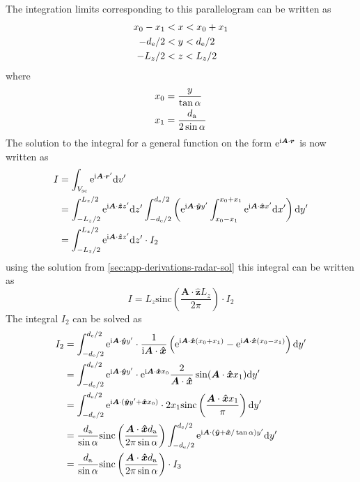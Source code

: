 \documentclass[11pt,twoside]{eitExjobb}
\begin{document}
	The integration limits corresponding to this parallelogram can be written as
	\begin{align*}
		x_0 - x_1 &< x < x_0 + x_1 \\
		-d_{\mathrm{e}}/2 &< y < d_{\mathrm{e}}/2 \\
		-L_{z}/2 &< z < L_{z}/2
	\end{align*}
	where
	\begin{align*}
		x_0 &= \frac{y}{\tan{\alpha}} \\
		x_1 &= \frac{d_{\mathrm{a}}}{2\sin{\alpha}}
	\end{align*}
	The solution to the integral for a general function on the form $\mathrm{e}^{\mathrm{i} \bm{A} \cdot \bm{r}}$ is now written as
	\begin{equation*}
	\begin{split}
			I &= \int_{V_{\mathrm{sc}}} \mathrm{e}^{\mathrm{i} \bm{A} \cdot \bm{r}'} \mathrm{d}v' \\
			&= \int_{-L_{z}/2}^{L_{z}/2} \mathrm{e}^{\mathrm{i} \bm{A} \cdot \bm{\hat{z}} z'} \mathrm{d}z'
			\int_{-d_{\mathrm{e}}/2}^{d_{\mathrm{e}}/2} \left( \mathrm{e}^{\mathrm{i} \bm{A} \cdot \bm{\hat{y}} y'}
			\int_{x_0-x_1}^{x_0+x_1} \mathrm{e}^{\mathrm{i} \bm{A} \cdot \bm{\hat{x}} x'} \mathrm{d}x' \right) \mathrm{d}y' \\
			&= \int_{-L_{z}/2}^{L_{z}/2} \mathrm{e}^{\mathrm{i} \bm{A} \cdot \bm{\hat{z}} z'} \mathrm{d}z' \cdot I_2
	\end{split}
	\end{equation*}
	using the solution from \ref{sec:app-derivations-radar-sol}  this integral can be written as
	\begin{equation*}
		I = L_{z} \text{sinc}\left( \frac{\bm{A} \cdot \bm{\hat{z}} L_{z}}{2\pi} \right) \cdot I_2
	\end{equation*}
	The integral $I_2$ can be solved as
	\begin{equation*}
	\begin{split}
		I_2 &= \int_{-d_{\mathrm{e}}/2}^{d_{\mathrm{e}}/2} \mathrm{e}^{\mathrm{i} \bm{A} \cdot \bm{\hat{y}} y'}
		\cdot \frac{1}{\mathrm{i} \bm{A} \cdot \bm{\hat{x}}}
		\left( \mathrm{e}^{\mathrm{i} \bm{A} \cdot \bm{\hat{x}} (x_0+x_1)} - \mathrm{e}^{\mathrm{i} \bm{A} \cdot \bm{\hat{x}} (x_0-x_1)}\right) \mathrm{d}y' \\
		&=\int_{-d_{\mathrm{e}}/2}^{d_{\mathrm{e}}/2} \mathrm{e}^{\mathrm{i} \bm{A} \cdot \bm{\hat{y}} y'}
		\cdot \mathrm{e}^{\mathrm{i} \bm{A} \cdot \bm{\hat{x}} x_0} \frac{2}{\bm{A} \cdot \bm{\hat{x}}} \sin(\bm{A} \cdot \bm{\hat{x}} x_1) \mathrm{d}y' \\
		&=\int_{-d_{\mathrm{e}}/2}^{d_{\mathrm{e}}/2} \mathrm{e}^{\mathrm{i} \bm{A} \cdot (\bm{\hat{y}} y'+ \bm{\hat{x}} x_0)}
		\cdot 2x_1 \text{sinc}\left( \frac{\bm{A} \cdot \bm{\hat{x}} x_1}{\pi} \right) \mathrm{d}y' \\
		&= \frac{d_{\mathrm{a}}}{\sin{\alpha}} \text{sinc}\left( \frac{\bm{A} \cdot \bm{\hat{x}} d_{\mathrm{a}}}{2\pi \sin{\alpha}} \right) \int_{-d_{\mathrm{e}}/2}^{d_{\mathrm{e}}/2} \mathrm{e}^{\mathrm{i} \bm{A} \cdot (\bm{\hat{y}} + \bm{\hat{x}}/\tan{\alpha}) y'} \mathrm{d}y' \\
		&= \frac{d_{\mathrm{a}}}{\sin{\alpha}} \text{sinc}\left( \frac{\bm{A} \cdot \bm{\hat{x}} d_{\mathrm{a}}}{2\pi \sin{\alpha}} \right) \cdot I_3
	\end{split}
	\end{equation*}
\end{document}
